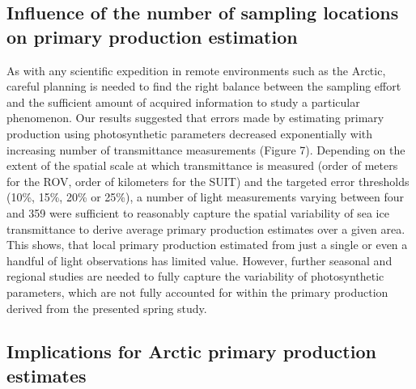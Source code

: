 \documentclass[draft]{agujournal2018}
\begin{document}
\subsection{Influence of the number of sampling locations on primary production estimation}

As with any scientific expedition in remote environments such as the Arctic, careful planning is needed to find the right balance between the sampling effort and the sufficient  amount of acquired information to study a particular phenomenon. Our results suggested that errors made by estimating primary production using photosynthetic parameters decreased exponentially with increasing number of transmittance measurements (Figure 7). Depending on the extent of the spatial scale at which transmittance is measured (order of meters for the ROV, order of kilometers for the SUIT) and the targeted error thresholds (10\%, 15\%, 20\% or 25\%), a number of light measurements varying between four and 359 were sufficient to reasonably capture the spatial variability of sea ice transmittance to derive average primary production estimates over a given area. This shows, that local primary production estimated from just a single or even a handful of light observations has limited value. However, further seasonal and regional studies are needed to fully capture the variability of photosynthetic parameters, which are not fully accounted for within the primary production derived from the presented spring study.

\subsection{Implications for Arctic primary production estimates}
\end{document}
